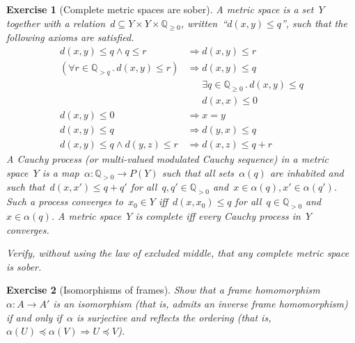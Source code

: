 \documentclass{ws-rv9x6}
\newtheorem{ex}{Exercise}
\newenvironment{exercise}[1]{
  \begin{ex}[#1]
}{\end{ex}}
\newcommand{\QQ}{\mathbb{Q}}
\renewcommand{\_}{\mathpunct{.}}
\newcommand{\?}{\,{:}\,}
\begin{document}
\begin{exercise}{Complete metric spaces are sober}
A \emph{metric space} is a set~$Y$ together with a relation~$d \subseteq Y
\times Y \times \QQ_{\geq0}$, written~``$d(x,y) \leq q$'', such that the
following axioms are satisfied.
\begin{align*}
  d(x,y) \leq q \wedge q \leq r &\Longrightarrow d(x,y) \leq r \\
  (\forall r \in \QQ_{> q}\_ d(x,y) \leq r) &\Longrightarrow d(x,y) \leq q \\
  &\mathrel{\phantom{\Longrightarrow}} \exists q \in \QQ_{\geq0}\_ d(x,y) \leq q \\
  &\mathrel{\phantom{\Longrightarrow}} d(x,x) \leq 0 \\
  d(x,y) \leq 0 &\Longrightarrow x = y \\
  d(x,y) \leq q &\Longrightarrow d(y,x) \leq q \\
  d(x,y) \leq q \wedge d(y,z) \leq r &\Longrightarrow d(x,z) \leq q+r
\end{align*}
A \emph{Cauchy process} (or \emph{multi-valued modulated Cauchy sequence}) in a metric
space~$Y$ is a map~$\alpha : \QQ_{>0} \to P(Y)$ such that all sets~$\alpha(q)$
are inhabited and such that~$d(x,x') \leq q + q'$ for all~$q,q' \in \QQ_{>0}$
and~$x \in \alpha(q), x' \in \alpha(q')$. Such a process \emph{converges
to}~$x_0 \in Y$ iff~$d(x,x_0) \leq q$ for all~$q \in \QQ_{>0}$
and~$x \in \alpha(q)$. A metric space~$Y$ is \emph{complete} iff every Cauchy
process in~$Y$ converges.

Verify, without using the law of excluded middle, that any complete metric
space is sober.
\end{exercise}

\begin{exercise}{Isomorphisms of frames}%
Show that a frame homomorphism~$\alpha : A \to A'$ is an isomorphism (that is,
admits an inverse frame homomorphism) if and only if~$\alpha$ is surjective and
reflects the ordering (that is,~$\alpha(U) \preceq \alpha(V) \Rightarrow U
\preceq V$).
\end{exercise}
\end{document}
